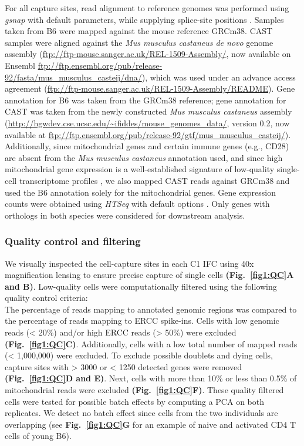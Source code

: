 For all capture sites, read alignment to reference genomes was performed using \emph{gsnap} with default parameters, while supplying splice-site positions \citep{Wu2010a}. Samples taken from B6 were mapped against the mouse reference \gls{GRCm38}. CAST samples were aligned against the \emph{Mus musculus castaneus de novo} genome assembly (\url{ftp://ftp-mouse.sanger.ac.uk/REL-1509-Assembly/}, now available on Ensembl \url{ftp://ftp.ensembl.org/pub/release-92/fasta/mus_musculus_casteij/dna/}), which was used under an advance access agreement (\url{ftp://ftp-mouse.sanger.ac.uk/REL-1509-Assembly/README}). Gene annotation for B6 was taken from the GRCm38 reference; gene annotation for CAST was taken from the newly constructed \emph{Mus musculus castaneus} assembly (\url{http://hgwdev.cse.ucsc.edu/~ifiddes/mouse_genomes_data/}, version 0.2, now available at \url{ftp://ftp.ensembl.org/pub/release-92/gtf/mus_musculus_casteij/}). Additionally, since mitochondrial genes and certain immune genes (e.g., CD28) are absent from the \emph{Mus musculus castaneus} annotation used, and since high mitochondrial gene expression is a well-established signature of low-quality single-cell transcriptome profiles \citep{Ilicic2016}, we also mapped CAST reads against GRCm38 and used the B6 annotation solely for the mitochondrial genes. Gene expression counts were obtained using \emph{HTSeq} with default options \citep{Anders2014}. Only genes with orthologs in both species were considered for downstream analysis. 

\subsubsection{Quality control and filtering}

We visually inspected the cell-capture sites in each C1 IFC using 40x magnification lensing to ensure precise capture of single cells \textbf{(Fig.~\ref{fig1:QC}A and B)}. Low-quality cells were computationally filtered using the following quality control criteria:\\
The percentage of reads mapping to annotated genomic regions was compared to the percentage of reads mapping to ERCC spike-ins. Cells with low genomic reads (< 20\%) and/or high ERCC reads (> 50\%) were excluded \textbf{(Fig.~\ref{fig1:QC}C)}. Additionally, cells with  a low total number of mapped reads (< 1,000,000) were excluded. To exclude possible doublets and dying cells, capture sites with > 3000 or < 1250 detected genes were removed \textbf{(Fig.~\ref{fig1:QC}D and E)}. Next, cells with more than 10\% or less than 0.5\% of mitochondrial reads were excluded \textbf{(Fig.~\ref{fig1:QC}F)}. These quality filtered cells were tested for possible batch effects by computing a PCA on both replicates. We detect no batch effect since cells from the two individuals are overlapping (see \textbf{Fig.~\ref{fig1:QC}G} for an example of naive and activated CD4\plus{} T cells of young B6).\\

